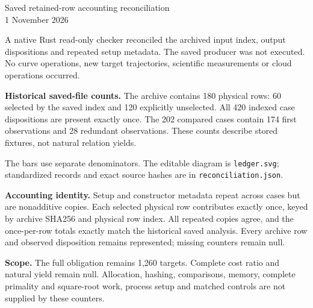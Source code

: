 \documentclass[11pt]{article}
\begin{document}
\begin{center}{\Large Saved retained-row accounting reconciliation}\\1 November 2026\end{center}
A native Rust read-only checker reconciled the archived input index, output dispositions and repeated setup metadata. The saved producer was not executed. No curve operations, new target trajectories, scientific measurements or cloud operations occurred.

\textbf{Historical saved-file counts.} The archive contains 180 physical rows: 60 selected by the saved index and 120 explicitly unselected. All 420 indexed case dispositions are present exactly once. The 202 compared cases contain 174 first observations and 28 redundant observations. These counts describe stored fixtures, not natural relation yields.

\begin{center}\end{center}
The bars use separate denominators. The editable diagram is \texttt{ledger.svg}; standardized records and exact source hashes are in \texttt{reconciliation.json}.

\textbf{Accounting identity.} Setup and constructor metadata repeat across cases but are nonadditive copies. Each selected physical row contributes exactly once, keyed by archive SHA256 and physical row index. All repeated copies agree, and the once-per-row totals exactly match the historical saved analysis. Every archive row and observed disposition remains represented; missing counters remain null.

\textbf{Scope.} The full obligation remains 1,260 targets. Complete cost ratio and natural yield remain null. Allocation, hashing, comparisons, memory, complete primality and square-root work, process setup and matched controls are not supplied by these counters.
\newpage
\end{document}

